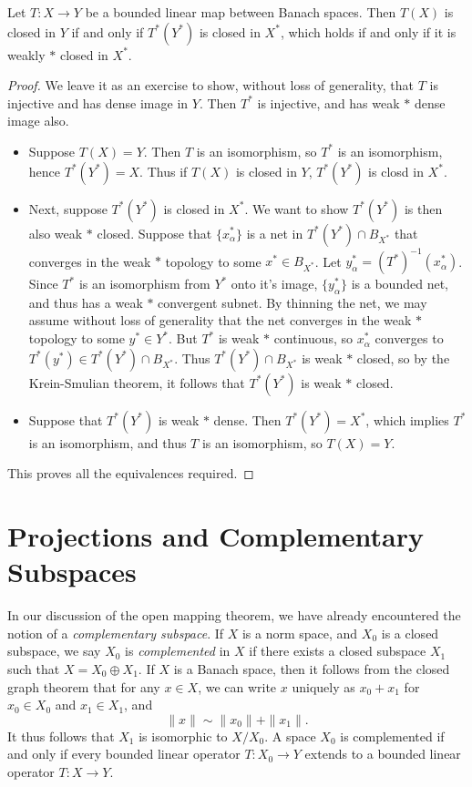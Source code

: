 \begin{theorem}
    Let $T: X \to Y$ be a bounded linear map between Banach spaces. Then $T(X)$ is closed in $Y$ if and only if $T^*(Y^*)$ is closed in $X^*$, which holds if and only if it is weakly $*$ closed in $X^*$.
\end{theorem}
\begin{proof}
    We leave it as an exercise to show, without loss of generality, that $T$ is injective and has dense image in $Y$. Then $T^*$ is injective, and has weak $*$ dense image also.
    \begin{itemize}
        \item Suppose $T(X) = Y$. Then $T$ is an isomorphism, so $T^*$ is an isomorphism, hence $T^*(Y^*) = X$. Thus if $T(X)$ is closed in $Y$, $T^*(Y^*)$ is closd in $X^*$.
        \item Next, suppose $T^*(Y^*)$ is closed in $X^*$. We want to show $T^*(Y^*)$ is then also weak $*$ closed. Suppose that $\{ x_\alpha^* \}$ is a net in $T^*(Y^*) \cap B_{X^*}$ that converges in the weak $*$ topology to some $x^* \in B_{X^*}$. Let $y^*_\alpha = (T^*)^{-1}(x_\alpha^*)$. Since $T^*$ is an isomorphism from $Y^*$ onto it's image, $\{ y^*_\alpha \}$ is a bounded net, and thus has a weak $*$ convergent subnet. By thinning the net, we may assume without loss of generality that the net converges in the weak $*$ topology to some $y^* \in Y^*$. But $T^*$ is weak $*$ continuous, so $x^*_\alpha$ converges to $T^*(y^*) \in T^*(Y^*) \cap B_{X^*}$. Thus $T^*(Y^*) \cap B_{X^*}$ is weak $*$ closed, so by the Krein-Smulian theorem, it follows that $T^*(Y^*)$ is weak $*$ closed.

        \item Suppose that $T^*(Y^*)$ is weak $*$ dense. Then $T^*(Y^*) = X^*$, which implies $T^*$ is an isomorphism, and thus $T$ is an isomorphism, so $T(X) = Y$.
    \end{itemize}
    This proves all the equivalences required.
\end{proof}




\section{Projections and Complementary Subspaces}

In our discussion of the open mapping theorem, we have already encountered the notion of a \emph{complementary subspace}. If $X$ is a norm space, and $X_0$ is a closed subspace, we say $X_0$ is \emph{complemented} in $X$ if there exists a closed subspace $X_1$ such that $X = X_0 \oplus X_1$. If $X$ is a Banach space, then it follows from the closed graph theorem that for any $x \in X$, we can write $x$ uniquely as $x_0 + x_1$ for $x_0 \in X_0$ and $x_1 \in X_1$, and
%
\[ \| x \| \sim \| x_0 \| + \| x_1 \|. \]
%
It thus follows that $X_1$ is isomorphic to $X/X_0$. A space $X_0$ is complemented if and only if every bounded linear operator $T:X_0 \to Y$ extends to a bounded linear operator $T: X \to Y$.

